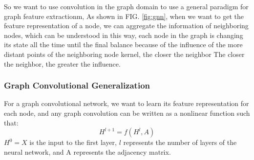 \documentclass[%
reprint,
amsmath,amssymb,
aps,
]{revtex4-2}
\begin{document}
	So we want to use convolution in the graph domain to use a general paradigm for graph feature extractionm, As shown in FIG. \ref{fig:gnn}, when we want to get the feature representation of a node, we can aggregate the information of neighboring nodes, which can be understood in this way, each node in the graph is changing its state all the time until the final balance because of the influence of the more distant points of the neighboring node kernel, the closer the neighbor The closer the neighbor, the greater the influence.
	\subsubsection{Graph Convolutional Generalization}	
	For a graph convolutional network, we want to learn its feature representation for each node, and any graph convolution can be written as a nonlinear function such that:
	\begin{equation}\label{key}
		H^{l+1} = f(H^l,A)
	\end{equation}
	$H^0 = X$ is the input to the first layer, $l$ represents the number of layers of the neural network, and A represents the adjacency matrix.
\end{document}
